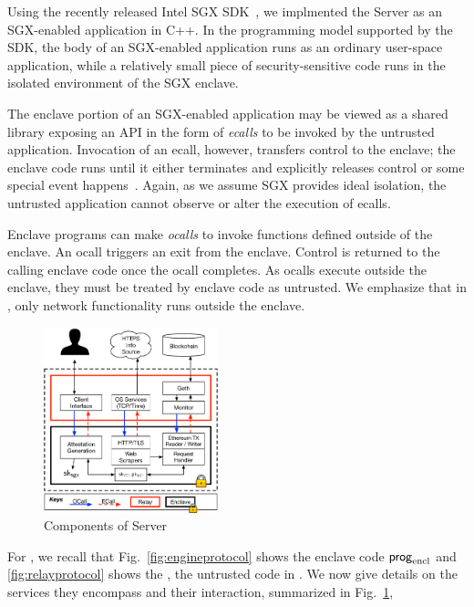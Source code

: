 

Using the recently released Intel SGX SDK~\cite{sgxsdk}, we implmented the \tc
Server as an SGX-enabled application in C++. In the programming model supported by
the SDK, the body of an SGX-enabled application runs as an 
ordinary user-space application, while a relatively small piece of security-sensitive code runs in the isolated environment of the SGX enclave.

The enclave portion of an SGX-enabled application may be
viewed as a shared library exposing an API in the form of \emph{ecalls}
to be invoked by the untrusted application. Invocation of an ecall, however, transfers control to the 
enclave; the enclave code runs until it either terminates and explicitly releases control or some special event happens~\cite{sgxmanual}.
Again, as we assume SGX provides ideal isolation, the untrusted application cannot
observe or alter the execution of ecalls.

Enclave programs can make \emph{ocalls} to invoke functions defined outside of the enclave. An ocall triggers an exit from the enclave. Control is returned to the calling enclave code once the ocall completes. As ocalls execute outside the enclave, they must be treated by enclave code as untrusted. We emphasize that in \tc, only network functionality runs outside the enclave.

\begin{figure}[h]
    \centering
    \includegraphics[width=0.45\textwidth]{figures/impl}
    \caption{Components of \tc Server}
    \label{fig:tcserver_impl}
\end{figure}

For \tc, we recall that Fig.~\ref{fig:engineprotocol} shows the enclave code ${\sf prog}_{\textrm{encl}}$ and \ref{fig:relayprotocol} shows the \medname, the untrusted code in \tc. We now give details on the services they encompass and their interaction, summarized in Fig.~\ref{fig:tcserver_impl}, 

